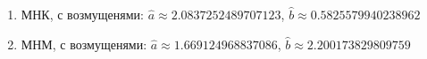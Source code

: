 \begin{enumerate}
\item МНК, с возмущенями:
$\hat{a}\approx 2.0837252489707123$, $\hat{b}\approx 0.5825579940238962$
\item МНМ, с возмущенями:
$\hat{a}\approx 1.669124968837086$, $\hat{b}\approx 2.200173829809759$
\end{enumerate}
